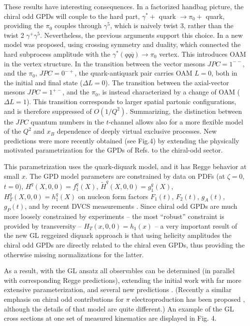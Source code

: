 These results have interesting consequences. In a factorized handbag picture, the chiral odd GPDs will couple to the hard part, $\gamma^{*} +$ quark $\rightarrow \pi_0 +$ quark, providing the $\pi_0$ couples through $\gamma^5$, which is naively twist 3, rather than the twist 2 $\gamma^+ \gamma^5$. Nevertheless, the previous arguments support this choice. In \cite{9} a new model was proposed, using crossing symmetry and duality, which connected the hard subprocess amplitude with the $\gamma^{*}(qq\overline{q}) \rightarrow \pi_0$ vertex. This introduces OAM in the vertex structure. In the transition between the vector mesons $J P C = 1^{−−}$, and the $\pi_0$, $J P C = 0^{−+}$, the quark-antiquark pair carries OAM $L = 0$, both in the initial and final state ($\Delta L = 0$). The transition between the axial-vector mesons $J P C = 1^{+−}$, and the $\pi_0$, is instead characterized by a change of OAM ($\Delta L = 1$). This transition corresponds to larger spatial partonic configurations, and is therefore suppressed of $O(1/Q^2)$. Summarizing, the distinction between the $J P C$ quantum numbers in the $t$-channel allows also for a more flexible model of the $Q^2$ and $x_B$ dependence of deeply virtual exclusive processes. New predictions were more recently obtained (see Fig.4) by extending the physically motivated parametrization for the GPDs of Refs.\cite{11, 25} to the chiral-odd sector.

This parametrization uses the quark-diquark model, and it has Regge behavior at small $x$. The GPD model parameters are constrained by data on PDFs (at $\zeta = 0$, $t = 0$), $H^q (X, 0, 0) = f^q_1 (X)$, $\tilde{H}^q (X, 0, 0) = g^q_1 (X)$, $H^q_T (X, 0, 0) = h^q_1 (X)$ on nucleon form factors $F_1(t)$, $F_2(t)$, $g_A(t)$, $g_P (t)$, and by recent DVCS measurements \cite{2} \cite{3}. Since chiral odd GPDs are much more loosely constrained by experiments – the most “robust” constraint is provided by transversity – $H_T (x, 0, 0) = h_1(x)$ – a very important result of the new GL reggeized diquark approach \cite{10} is that using helicity amplitudes the chiral odd GPDs are directly related to the chiral even GPDs, thus providing the otherwise missing normalizations for the latter.

As a result, with the GL ansatz all observables can be determined (in parallel with corresponding Regge predictions), extending the initial work \cite{9} with far more extensive parameterization, and several new predictions \cite{11, 10}. (Recently a similar emphasis on chiral odd contributions for $\pi$ electroproduction has been proposed \cite{5}, although the details of that model are quite different.) An example of the GL cross sections at one set of measured kinematics are displayed in Fig. 4.
\fi
